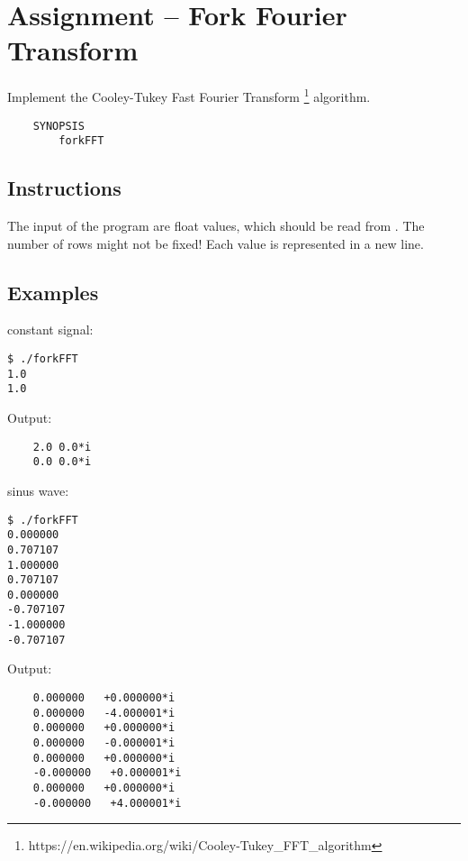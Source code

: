 
\usepackage{amsmath}



\section*{ Assignment -- Fork Fourier Transform}
Implement the Cooley-Tukey Fast Fourier Transform \footnote{https://en.wikipedia.org/wiki/Cooley-Tukey\_FFT\_algorithm} algorithm.
\begin{verbatim}
    SYNOPSIS
        forkFFT
\end{verbatim}

\subsection*{Instructions}
The input of the program are float values, which should be read from .  The number of rows might not be fixed! Each value is represented in a new line.
\subsection*{Examples}
constant signal:
\begin{verbatim}
$ ./forkFFT
1.0
1.0
\end{verbatim}
Output: 
\begin{verbatim}
	2.0	0.0*i
	0.0	0.0*i
\end{verbatim}
sinus wave:
\begin{verbatim}
$ ./forkFFT
0.000000
0.707107
1.000000
0.707107
0.000000
-0.707107
-1.000000
-0.707107
\end{verbatim}
Output: 
\begin{verbatim}
 	0.000000   +0.000000*i
 	0.000000   -4.000001*i
 	0.000000   +0.000000*i
 	0.000000   -0.000001*i
 	0.000000   +0.000000*i
 	-0.000000   +0.000001*i
 	0.000000   +0.000000*i
 	-0.000000   +4.000001*i
\end{verbatim}
